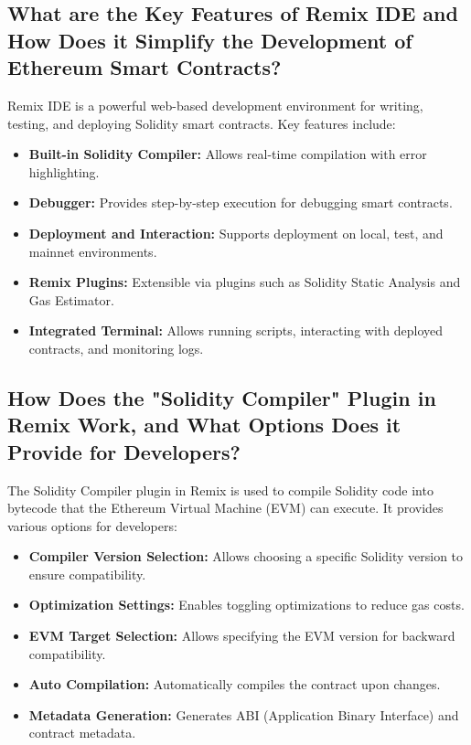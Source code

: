 \documentclass[11pt]{article}
\begin{document}
\subsection{What are the Key Features of Remix IDE and How Does it Simplify the Development of Ethereum Smart Contracts?}

Remix IDE is a powerful web-based development environment for writing, testing, and deploying Solidity smart contracts. Key features include:

\begin{itemize}
    \item \textbf{Built-in Solidity Compiler:} Allows real-time compilation with error highlighting.
    \item \textbf{Debugger:} Provides step-by-step execution for debugging smart contracts.
    \item \textbf{Deployment and Interaction:} Supports deployment on local, test, and mainnet environments.
    \item \textbf{Remix Plugins:} Extensible via plugins such as Solidity Static Analysis and Gas Estimator.
    \item \textbf{Integrated Terminal:} Allows running scripts, interacting with deployed contracts, and monitoring logs.
\end{itemize}

\subsection{How Does the "Solidity Compiler" Plugin in Remix Work, and What Options Does it Provide for Developers?}

The Solidity Compiler plugin in Remix is used to compile Solidity code into bytecode that the Ethereum Virtual Machine (EVM) can execute. It provides various options for developers:

\begin{itemize}
    \item \textbf{Compiler Version Selection:} Allows choosing a specific Solidity version to ensure compatibility.
    \item \textbf{Optimization Settings:} Enables toggling optimizations to reduce gas costs.
    \item \textbf{EVM Target Selection:} Allows specifying the EVM version for backward compatibility.
    \item \textbf{Auto Compilation:} Automatically compiles the contract upon changes.
    \item \textbf{Metadata Generation:} Generates ABI (Application Binary Interface) and contract metadata.
\end{itemize}
\end{document}
